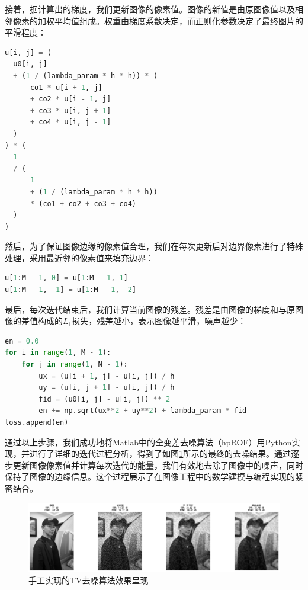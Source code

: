 \documentclass[UTF8]{ctexart}
\begin{document}
接着，据计算出的梯度，我们更新图像的像素值。图像的新值是由原图像值以及相邻像素的加权平均值组成。权重由梯度系数决定，而正则化参数决定了最终图片的平滑程度：
\begin{lstlisting}[language=Python, caption={引入正则}, label={lst:code2}, mathescape=true, breaklines=true]
u[i, j] = (
  u0[i, j]
  + (1 / (lambda_param * h * h)) * (
      co1 * u[i + 1, j]
      + co2 * u[i - 1, j]
      + co3 * u[i, j + 1]
      + co4 * u[i, j - 1]
  )
) * (
  1
  / (
      1
      + (1 / (lambda_param * h * h))
      * (co1 + co2 + co3 + co4)
  )
)
\end{lstlisting}

然后，为了保证图像边缘的像素值合理，我们在每次更新后对边界像素进行了特殊处理，采用最近邻的像素值来填充边界：
\begin{lstlisting}[language=Python, caption={领域填充}, label={lst:code3}, mathescape=true, breaklines=true]
u[1:M - 1, 0] = u[1:M - 1, 1]
u[1:M - 1, -1] = u[1:M - 1, -2]
\end{lstlisting}

最后，每次迭代结束后，我们计算当前图像的残差。残差是由图像的梯度和与原图像的差值构成的$L_1$损失，残差越小，表示图像越平滑，噪声越少：
\begin{lstlisting}[language=Python, caption={执行去噪}, label={lst:code4}, mathescape=true, breaklines=true]
en = 0.0
for i in range(1, M - 1):
    for j in range(1, N - 1):
        ux = (u[i + 1, j] - u[i, j]) / h
        uy = (u[i, j + 1] - u[i, j]) / h
        fid = (u0[i, j] - u[i, j]) ** 2
        en += np.sqrt(ux**2 + uy**2) + lambda_param * fid
loss.append(en)
\end{lstlisting}

通过以上步骤，我们成功地将Matlab中的全变差去噪算法（hpROF）用Python实现，并进行了详细的迭代过程分析，得到了如图\ref{fig:tvfromscratch}所示的最终的去噪结果。通过逐步更新图像像素值并计算每次迭代的能量，我们有效地去除了图像中的噪声，同时保持了图像的边缘信息。这个过程展示了在图像工程中的数学建模与编程实现的紧密结合。
\begin{figure}[H]
  \centering
  \includegraphics[width=\textwidth]{./images/tvfromscratch.png} 
  \caption{手工实现的TV去噪算法效果呈现}
  \label{fig:tvfromscratch}
\end{figure}
\end{document}
